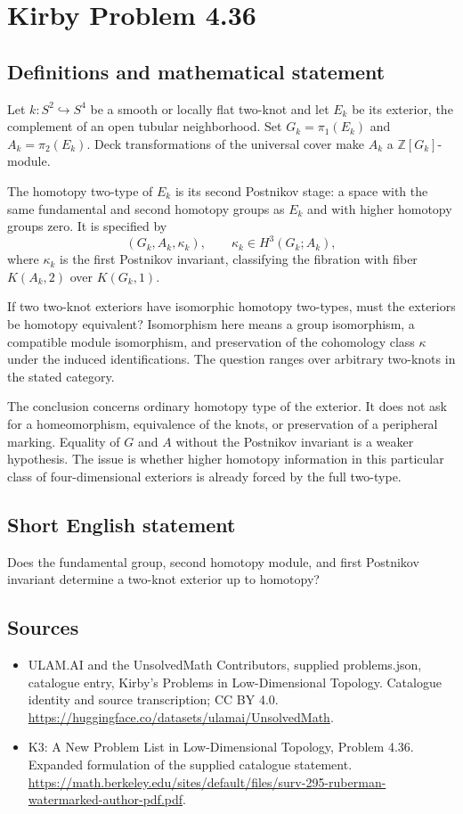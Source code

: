 \documentclass[11pt,a4paper]{article}
\begin{document}
\section*{Kirby Problem 4.36}\label{statement}

\subsection{Definitions and mathematical statement}
Let $k:S^2\hookrightarrow S^4$ be a smooth or locally flat two-knot and let $E_k$ be its exterior, the complement of an open tubular neighborhood. Set $G_k=\pi_1(E_k)$ and $A_k=\pi_2(E_k)$. Deck transformations of the universal cover make $A_k$ a $\mathbb Z[G_k]$-module.

The homotopy two-type of $E_k$ is its second Postnikov stage: a space with the same fundamental and second homotopy groups as $E_k$ and with higher homotopy groups zero. It is specified by
\[
(G_k,A_k,\kappa_k),\qquad
\kappa_k\in H^3(G_k;A_k),
\]
where $\kappa_k$ is the first Postnikov invariant, classifying the fibration with fiber $K(A_k,2)$ over $K(G_k,1)$.

If two two-knot exteriors have isomorphic homotopy two-types, must the exteriors be homotopy equivalent? Isomorphism here means a group isomorphism, a compatible module isomorphism, and preservation of the cohomology class $\kappa$ under the induced identifications. The question ranges over arbitrary two-knots in the stated category.

The conclusion concerns ordinary homotopy type of the exterior. It does not ask for a homeomorphism, equivalence of the knots, or preservation of a peripheral marking. Equality of $G$ and $A$ without the Postnikov invariant is a weaker hypothesis. The issue is whether higher homotopy information in this particular class of four-dimensional exteriors is already forced by the full two-type.
\subsection{Short English statement}
Does the fundamental group, second homotopy module, and first Postnikov invariant determine a two-knot exterior up to homotopy?
\subsection{Sources}
\begin{itemize}
\item[S1] ULAM.AI and the UnsolvedMath Contributors, supplied problems.json, catalogue entry, Kirby's Problems in Low-Dimensional Topology. Catalogue identity and source transcription; CC BY 4.0.
\url{https://huggingface.co/datasets/ulamai/UnsolvedMath}.
\item[S2] K3: A New Problem List in Low-Dimensional Topology, Problem 4.36. Expanded formulation of the supplied catalogue statement.
\url{https://math.berkeley.edu/sites/default/files/surv-295-ruberman-watermarked-author-pdf.pdf}.
\end{itemize}
\end{document}
